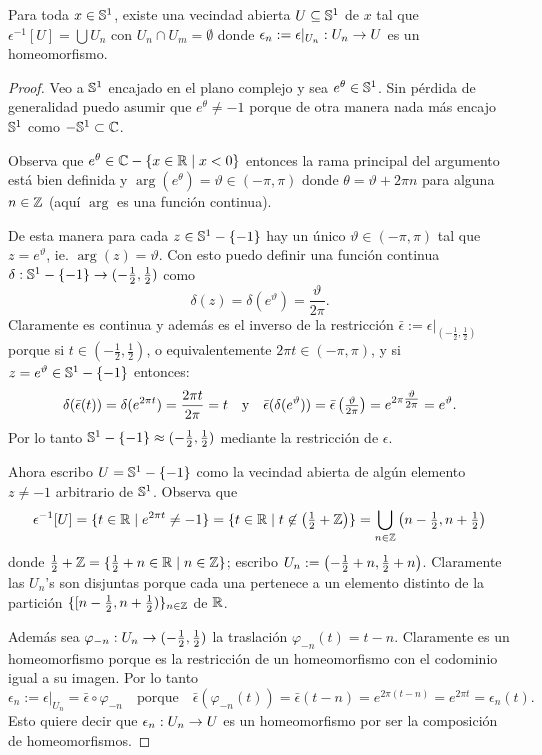 \begin{ejercicio}\label{ej:26}
  Para toda $x\in\mathbb{S}^1$, existe una vecindad abierta $U\subseteq\mathbb{S}^1$ de $x$ tal que
  $\epsilon^{-1}[U]=\bigcup U_n$ con $U_n\cap U_m=\emptyset$ donde $\epsilon_n:=\epsilon|_{U_n}:U_n\rightarrow U$
  es un homeomorfismo.
\end{ejercicio}
\begin{proof}%
  Veo a $\mathbb{S}^1$ encajado en el plano complejo y sea $e^{\theta}\in\mathbb{S}^1$. Sin p\'erdida de generalidad
  puedo asumir que $e^{\theta}\neq -1$ porque de otra manera nada m\'as encajo $\mathbb{S}^1$ como
  $-\mathbb{S}^1\subset\mathbb{C}$.

  Observa que $e^{\theta}\in\mathbb{C}-\{x\in\mathbb{R} \mid x<0\}$ entonces la rama principal del argumento est\'a
  bien definida y $\arg(e^{\theta})=\vartheta\in(-\pi,\pi)$ donde $\theta=\vartheta+2\pi n$ para alguna
  $n\in\mathbb{Z}$ (aqu\'i $\arg$ es una funci\'on continua).

  De esta manera para cada $z\in\mathbb{S}^1-\{-1\}$ hay un \'unico $\vartheta\in(-\pi,\pi)$ tal que
  $z=e^{\vartheta}$, ie. $\arg(z)=\vartheta$. Con esto puedo definir una funci\'on continua
  $\delta:\mathbb{S}^1-\{-1\}\rightarrow (-\tfrac{1}{2},\tfrac{1}{2})$ como
  \[
    \delta(z)=\delta(e^{\vartheta})=\frac{\vartheta}{2\pi}.
  \]
  Claramente es continua y adem\'as es el inverso de la restricci\'on
  $\bar{\epsilon}:=\epsilon|_{(-\tfrac{1}{2},\tfrac{1}{2})}$ porque si
  $t\in(-\tfrac{1}{2},\tfrac{1}{2})$,
  o equivalentemente $2\pi t\in(-\pi,\pi)$, y si $z=e^{\vartheta}\in\mathbb{S}^1-\{-1\}$ entonces:
  \[
    \delta(\bar{\epsilon}(t))=
    \delta(e^{2\pi t})=
    \frac{2\pi t}{2\pi}=
    t \quad\text{y}\quad
    \bar{\epsilon}(\delta(e^{\vartheta}))=
    \bar{\epsilon}\left( \tfrac{\vartheta}{2\pi} \right)=
    e^{2\pi\tfrac{\vartheta}{2\pi}}=
    e^{\vartheta}.
  \]
  Por lo tanto $\mathbb{S}^1-\{-1\}\approx(-\tfrac{1}{2},\tfrac{1}{2})$ mediante la restricci\'on de $\epsilon$.

  Ahora escribo $U=\mathbb{S}^1-\{-1\}$ como la vecindad abierta de alg\'un elemento $z\neq -1$ arbitrario de
  $\mathbb{S}^1$. Observa que
  \[
    \epsilon^{-1}[U]=
    \{t\in\mathbb{R} \mid e^{2\pi t}\neq -1\}=
    \{t\in\mathbb{R} \mid t\not\in\left( \tfrac{1}{2}+\mathbb{Z} \right)\}=
    \bigcup_{n\in\mathbb{Z}}\left( n-\tfrac{1}{2},n+\tfrac{1}{2} \right)
  \]
  donde $\tfrac{1}{2}+\mathbb{Z}=\{\tfrac{1}{2}+n\in\mathbb{R}\mid n\in\mathbb{Z}\}$; escribo
  $U_n:=\left( -\tfrac{1}{2}+n,\tfrac{1}{2}+n \right)$. Claramente las $U_n$'s son disjuntas porque cada
  una pertenece a un elemento distinto de la partici\'on
  $\{ [n-\tfrac{1}{2},n+\tfrac{1}{2})\}_{n\in\mathbb{Z}}$ de $\mathbb{R}$.

  Adem\'as sea
  $\varphi_{-n}:U_n\rightarrow(-\tfrac{1}{2},\tfrac{1}{2})$ la traslaci\'on $\varphi_{-n}(t)=t-n$. Claramente
  es un homeomorfismo porque es la restricci\'on de un homeomorfismo con el codominio igual a su imagen.
  Por lo tanto
  \[
    \epsilon_n:=\epsilon|_{U_n}=\bar{\epsilon}\circ\varphi_{-n} \quad\text{porque}\quad
    \bar{\epsilon}(\varphi_{-n}(t))=\bar{\epsilon}(t-n)=e^{2\pi(t-n)}=e^{2\pi t}=\epsilon_n(t).
  \]
  Esto quiere decir que $\epsilon_n:U_n\rightarrow U$ es un homeomorfismo por ser la composici\'on de
  homeomorfismos.  
\end{proof}%


